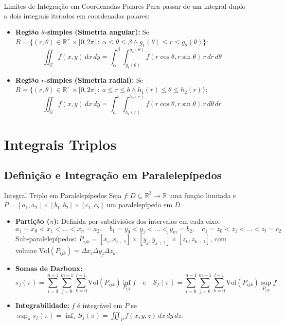 \documentclass[11pt,a4paper]{article}
\newcommand{\R}{\mathbb{R}}
\begin{document}
\noindent\begin{theorembox}{Limites de Integração em Coordenadas Polares}
  Para passar de um integral duplo a dois integrais iterados em coordenadas polares:
  \begin{itemize}
    \item \textbf{Região $\theta$-simples (Simetria angular):} Se $R = \{(r, \theta) \in \R^+ \times [0, 2\pi[ \ : \ \alpha \le \theta \le \beta \land g_1(\theta) \le r \le g_2(\theta)\}$:
      \[ \iint_S f(x, y) \, dx \, dy = \int_\alpha^\beta \int_{g_1(\theta)}^{g_2(\theta)} f(r\cos\theta, r\sin\theta) \, r \, dr \, d\theta \]
    \item \textbf{Região $r$-simples (Simetria radial):} Se $R = \{(r, \theta) \in \R^+ \times [0, 2\pi[ \ : \ a \le r \le b \land h_1(r) \le \theta \le h_2(r)\}$:
      \[ \iint_S f(x, y) \, dx \, dy = \int_a^b \int_{h_1(r)}^{h_2(r)} f(r\cos\theta, r\sin\theta) \, r \, d\theta \, dr \]
  \end{itemize}
\end{theorembox}

\newpage

\section{Integrais Triplos}
\label{chap:integrais_triplos}

\subsection{Definição e Integração em Paralelepípedos}

\begin{definitionbox}{Integral Triplo em Paralelepípedos}
  Seja $f : D \subseteq \R^3 \to \R$ uma função limitada e $P = [a_1, a_2] \times [b_1, b_2] \times [c_1, c_2]$ um paralelepípedo em $D$.
  \begin{itemize}
    \item \textbf{Partição ($\pi$):} Definida por subdivisões dos intervalos em cada eixo:
      \[ a_1 = x_0 < x_1 < \dots < x_n = a_2, \quad b_1 = y_0 < y_1 < \dots < y_m = b_2, \quad c_1 = z_0 < z_1 < \dots < z_l = c_2 \]
      Sub-paralelepípedos: $P_{ijk} = [x_i, x_{i+1}] \times [y_j, y_{j+1}] \times [z_k, z_{k+1}]$, com volume $\text{Vol}(P_{ijk}) = \Delta x_i \Delta y_j \Delta z_k$.
    \item \textbf{Somas de Darboux:}
      \[ s_f(\pi) = \sum_{i=0}^{n-1} \sum_{j=0}^{m-1} \sum_{k=0}^{l-1} \text{Vol}(P_{ijk}) \inf_{P_{ijk}} f \quad \text{e} \quad S_f(\pi) = \sum_{i=0}^{n-1} \sum_{j=0}^{m-1} \sum_{k=0}^{l-1} \text{Vol}(P_{ijk}) \sup_{P_{ijk}} f \]
    \item \textbf{Integrabilidade:} $f$ é integrável em $P$ se $\sup_{\pi} s_f(\pi) = \inf_{\pi} S_f(\pi) = \iiint_P f(x, y, z) \, dx \, dy \, dz$.
  \end{itemize}
\end{definitionbox}
\end{document}
